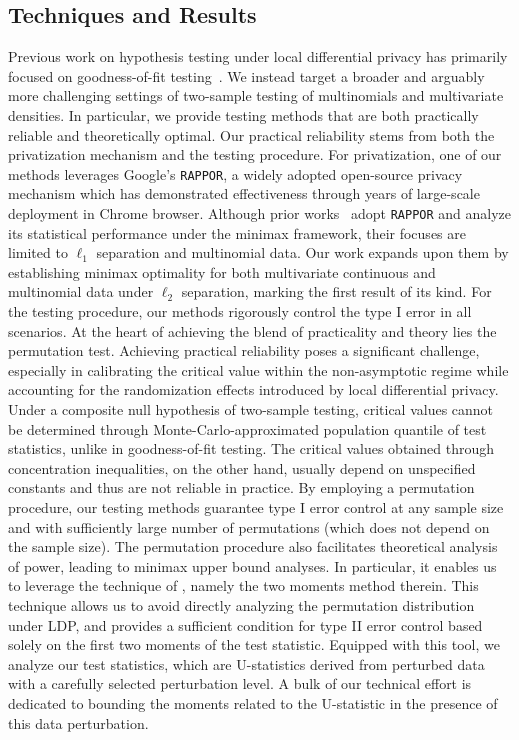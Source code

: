 \documentclass[twoside,11pt]{article}
\begin{document}
\subsection{Techniques and Results}\label{subsection:techniques}
Previous work on hypothesis testing under local differential privacy has primarily focused on goodness-of-fit testing~\citep{Dubois2022, Lam-Weil2021MinimaxConstraint}. We instead target a broader and arguably more challenging settings of two-sample testing of multinomials and multivariate densities.  In particular, we provide testing methods that are both practically reliable and theoretically optimal.
Our practical reliability stems from both the privatization mechanism and the testing procedure. For privatization, one of our methods leverages Google's \texttt{RAPPOR}, a widely adopted open-source privacy mechanism  which has demonstrated effectiveness through years of large-scale deployment in Chrome browser. 
Although prior works~\citep{duchi2013local, acharya_test_2019, acharya_estimating_2021} adopt \texttt{RAPPOR} and analyze its statistical performance under the minimax framework, their focuses are limited to $\ell_1$ separation and multinomial data. Our work expands upon them by establishing minimax optimality for both multivariate continuous and multinomial data under  $\ell_2$ separation, marking the first result of its kind.
For the testing procedure, our methods rigorously control the type I error in all scenarios. At the heart of achieving the blend of practicality and theory lies the permutation test.
Achieving practical reliability poses a significant challenge, especially in calibrating the critical value within the non-asymptotic regime while accounting for the randomization effects introduced by local differential privacy.
Under a composite null hypothesis of two-sample testing, critical values cannot be determined through Monte-Carlo-approximated population quantile of test statistics,
unlike in goodness-of-fit testing.
The critical values obtained through concentration inequalities, on the other hand, usually depend on unspecified constants and thus are not reliable in practice.
By employing a permutation procedure, our testing methods guarantee type I error control at any sample size and with sufficiently large number of permutations (which does not depend on the sample size). The permutation procedure also facilitates theoretical analysis of power, leading to minimax upper bound analyses. In particular, it enables us to leverage the technique of \citet{kim_minimax_2022}, namely the two moments method therein.
This technique allows us to avoid directly analyzing the permutation distribution under LDP, and provides a sufficient condition for type II error control based solely on the first two moments of the test statistic. Equipped with this tool, we analyze our test statistics, which are U-statistics derived from perturbed data with a carefully selected perturbation level. A bulk of our technical effort is dedicated to bounding the moments related to the U-statistic in the presence of this data perturbation.
\end{document}

